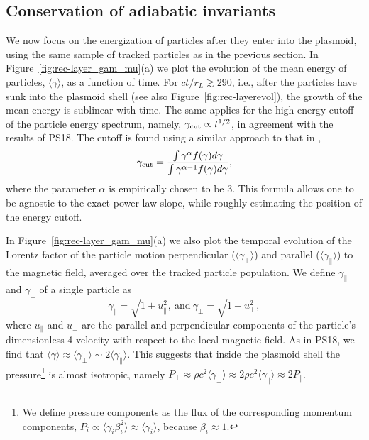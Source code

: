 \subsection*{Conservation of adiabatic invariants}
\label{sec:reconnection-conserv_ad_inv}
We now focus on the energization of particles after they enter into the plasmoid, using the same sample of tracked particles as in the previous section. In Figure~\ref{fig:rec-layer_gam_mu}(a) we plot the evolution of the mean energy of particles, $\langle \gamma\rangle$, as a function of time. For $ct/r_L \gtrsim 290$, i.e., after the particles have sunk into the plasmoid shell (see also Figure~\ref{fig:rec-layerevol}), the growth of the mean energy is sublinear with time. The same applies for the high-energy cutoff of the particle energy spectrum, namely, $\gamma_{\rm cut} \propto t^{1/2}$, in agreement with the results of PS18. The cutoff is found using a similar approach to that in \cite{2015ApJ...809...55B},
\begin{equation}
    \gamma_{\rm cut} = \frac{\int \gamma^{\alpha} f(\gamma)d\gamma}{\int \gamma^{\alpha - 1} f(\gamma)d\gamma},
\end{equation}
where the parameter $\alpha$ is empirically chosen to be $3$. This formula allows one to be agnostic to the exact power-law slope, while roughly estimating the position of the energy cutoff.

In Figure~\ref{fig:rec-layer_gam_mu}(a) we also plot the temporal evolution of the Lorentz factor of the particle motion perpendicular ($\langle\gamma_\perp\rangle$) and parallel ($\langle\gamma_{\parallel}\rangle$) to the magnetic field, averaged over the tracked particle population. We define $\gamma_{\parallel}$ and $\gamma_{\perp}$ of a single particle as
\begin{equation}
    \gamma_{\parallel} = \sqrt{1+u_{\parallel}^2},~\text{and}~\gamma_{\perp} = \sqrt{1+u_{\perp}^2},
\end{equation}
where $u_{\parallel}$ and $u_\perp$ are the parallel and perpendicular components of the particle's dimensionless 4-velocity with respect to the local magnetic field. As in PS18, we find that $\langle \gamma\rangle \approx \langle\gamma_{\perp}\rangle \sim 2 \langle\gamma_{\parallel}\rangle$. This suggests that inside the plasmoid shell the pressure\footnote{We define pressure components as the flux of the corresponding momentum components, $P_i\propto \langle\gamma_i\beta_i^2\rangle \approx \langle\gamma_i\rangle$, because $\beta_i\approx 1$.} is almost isotropic, namely $P_{\perp}\approx \rho c^2\langle\gamma_{\perp}\rangle \approx 2 \rho c^2 \langle\gamma_{\parallel}\rangle \approx 2P_{\parallel}$.


